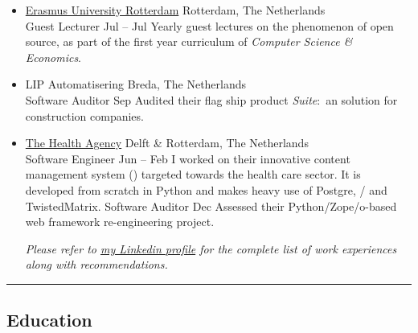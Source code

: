 \documentclass[10pt,a4paper]{article}
\begin{document}
\begin{itemize}
  \item  %
  \headerrow
    {\href{http://www.eur.nl}{Erasmus University Rotterdam}}
    {\sc Rotterdam, The Netherlands}
  \\
  \subheaderrow
    {Guest Lecturer}
    {Jul  -- Jul }
  Yearly guest lectures on the phenomenon of open source, as part of the first year curriculum of \emph{Computer Science \& Economics}.

  \item  %
  \headerrow
    {LIP Automatisering}
    {\sc Breda, The Netherlands}
  \\
  \subheaderrow
    {Software Auditor}
    {Sep }
  Audited their flag ship product \emph{ Suite}:\ an  solution for construction companies.

  \item  %
  \headerrow
    {\href{http://www.thehealthagency.com}{The Health Agency}}
    {\sc Delft \& Rotterdam, The Netherlands}
  \\
  \subheaderrow
    {Software Engineer}
    {Jun  -- Feb }
  {I worked on their innovative content management system () targeted towards the health care sector. It is developed from scratch in Python and makes heavy use of Postgre, / and TwistedMatrix.
  \vspace{0.2em}}
  \subheaderrow
    {Software Auditor}
    {Dec }
  Assessed their Python/Zope/o-based web framework re-engineering project.

  \begin{center}
    \emph{Please refer to \href{http://www.linkedin.com/in/ciesbreijs}{my Linkedin profile} for the complete list of work experiences along with recommendations.}
  \end{center}

\end{itemize}
\vspace{-0.2em}

\hrule \vspace{-0.4em} \subsection*{Education}
\end{document}
